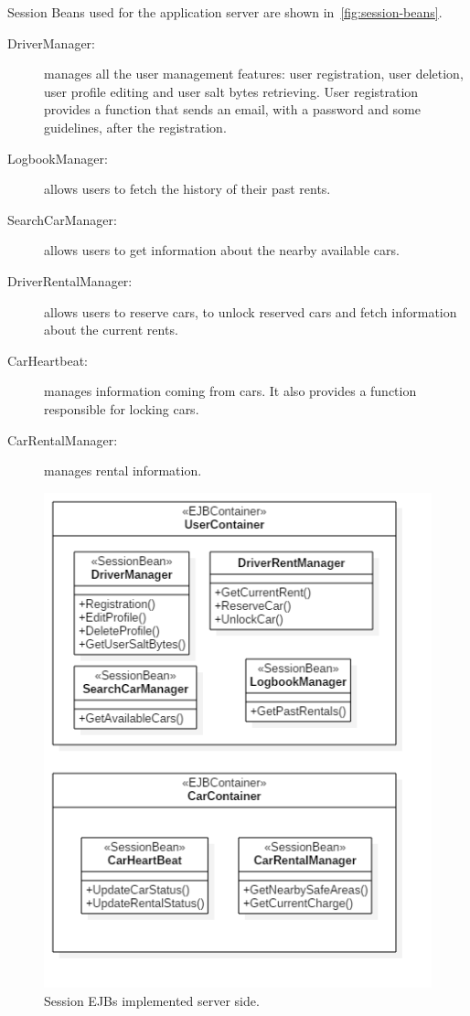 Session Beans used for the application server are shown in~\autoref{fig:session-beans}.

\begin{description}
	\item[DriverManager:] manages all the user management features: user registration, user deletion, user profile editing and user salt bytes retrieving.
User registration provides a function that sends an email, with a password and some guidelines, after the registration.
	\item[LogbookManager:] allows users to fetch the history of their past rents.
	\item[SearchCarManager:] allows users to get information about the nearby available cars.
	\item[DriverRentalManager:] allows users to reserve cars, to unlock reserved cars and fetch information about the current rents.
	\item[CarHeartbeat:] manages information coming from cars. It also provides a function responsible for locking cars.
	\item[CarRentalManager:] manages rental information.
\end{description}

\begin{figure}[H]
	\centering
	\includegraphics[width=\textwidth, keepaspectratio]{diagrams/SEJBs.png}
	\caption{Session EJBs implemented server side.}
	\label {fig:session-beans}
\end{figure}

